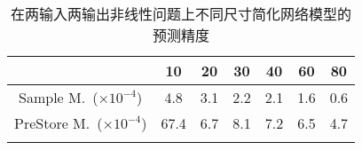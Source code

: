 \begin{center}
\begin{table}
	\caption{在两输入两输出非线性问题上不同尺寸简化网络模型的预测精度}
	\renewcommand\arraystretch{1.2}
	\setlength{\tabcolsep}{12pt}
	\begin{tabular}{ccccccc}
	\toprule
		 									&	10		&	20		&	30		&	40		&	60		&	80		\\	\midrule
	Sample M.~(\(\times 10^{-4}\))			&	4.8		&	3.1		&	2.2		&	2.1		&	1.6		&	0.6	 \\	\hline
	PreStore M.~(\(\times 10^{-4}\))	&	67.4	&	6.7		&	8.1		&	7.2		&	6.5		&	4.7	\\	
	\bottomrule
	\label{tab:2In2Out}
	\end{tabular}
\end{table}
\vspace{-3em}
\end{center}

